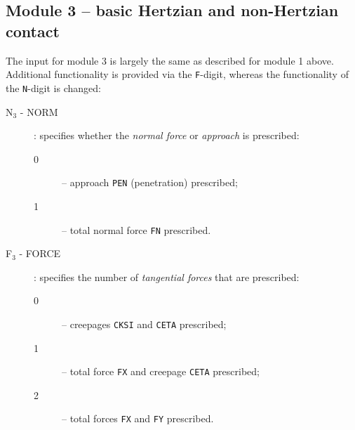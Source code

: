 \documentclass[12pt]{report}
\newcommand{\var}[1]{\mbox{\tt #1}}
\begin{document}
\subsection{Module 3 -- basic Hertzian and non-Hertzian contact}

The input for module 3 is largely the same as described for module 1 above.
Additional functionality is provided via the {\tt F}-digit, whereas the
functionality of the {\tt N}-digit is changed:

\begin{description}
\item[N$_3$ - NORM]  \label{n3-digit} : specifies whether the {\em normal
force\/} or {\em approach\/} is prescribed:
\begin{description}
\item[0] -- approach \var{PEN} (penetration) prescribed;
\item[1] -- total normal force \var{FN} prescribed.
\end{description}

\item[F$_3$ - FORCE] \label{f3-digit} : specifies the number of {\em
        tangential forces\/} that are prescribed:
\begin{description}
\item[0] -- creepages \var{CKSI} and \var{CETA} prescribed;
\item[1] -- total force \var{FX} and creepage \var{CETA} prescribed;
\item[2] -- total forces \var{FX} and \var{FY} prescribed.
\end{description}
\end{description}
\end{document}
